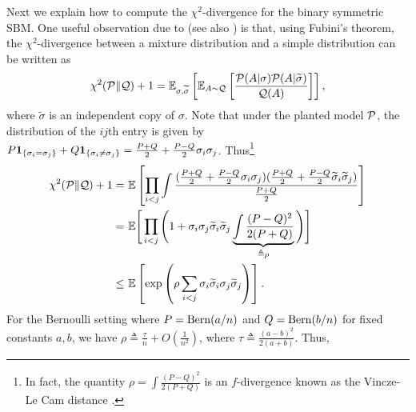 Next we explain how to compute the $\chi^2$-divergence for the binary symmetric SBM. 
One useful observation due to \cite{IS03} (see also \cite[Lemma 21.1]{it-stats}) is that, using Fubini's theorem, the $\chi^2$-divergence between a mixture distribution and a simple distribution can be written as
\[
\chi^2(\mathcal{P}\|\mathcal{Q}) + 1 = \mathbb{E}_{\sigma,\widetilde{\sigma}}\left[  \mathbb{E}_{A \sim \mathcal{Q}}\left[ \frac{\mathcal{P}(A|\sigma)\mathcal{P}(A|\widetilde\sigma)}{\mathcal{Q}(A)} \right] \right],
\]
where $\tilde\sigma$ is an independent copy of $\sigma$. 
Note that under the planted model ${\mathcal{P}}$, the distribution of the $ij$th entry is given by 
$P {\mathbf{1}_{\left\{{\sigma_i=\sigma_j}\right\}}} + Q {\mathbf{1}_{\left\{{\sigma_i \neq \sigma_j}\right\}}} = \frac{P+Q}{2} + \frac{P-Q}{2} \sigma_i \sigma_j$.
Thus\footnote{In fact, the quantity $\rho=\int\frac{(P-Q)^2}{2(P+Q)}$ is an $f$-divergence known as the Vincze-Le Cam distance \cite{Lecam86,Vajda09}.}
\begin{align}
\chi^2(\mathcal{P}\|\mathcal{Q}) + 1
= & ~ \mathbb{E}\left[ \prod_{i < j} \int \frac{(\frac{P+Q}{2} + \frac{P-Q}{2} \sigma_i \sigma_j)(\frac{P+Q}{2} + \frac{P-Q}{2} \widetilde{\sigma}_i \widetilde{\sigma}_j)}{\frac{P+Q}{2}} \right] \nonumber \\
= & ~ \mathbb{E}\Bigg[\prod_{i < j} \Bigg(1 +  \sigma_i \sigma_j \widetilde{\sigma}_i \widetilde{\sigma}_j \underbrace{\int \frac{(P-Q)^2}{2(P+Q)}}_{\triangleq \rho}\Bigg)\Bigg] \label{eq:SBM_second_moment_eq}\\
\leq & ~ \mathbb{E}\left[ \exp\left( \rho \sum_{i < j} \sigma_i \widetilde\sigma_i \sigma_j \widetilde \sigma_j  \right) \right].
\label{eq:SBM_second_moment}
\end{align}
For the Bernoulli setting where $P={\rm Bern}(a/n)$ and $Q={\rm Bern}(b/n)$ for 
fixed constants $a, b$,
we have $\rho \triangleq \frac{\tau}{n} + O(\frac{1}{n^2})$, where $\tau\triangleq\frac{(a-b)^2}{2(a+b)}$. 
Thus,
